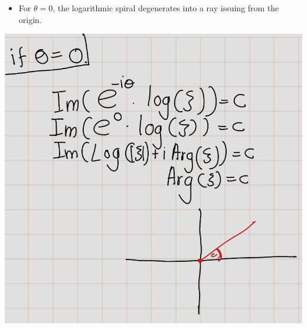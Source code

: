 \documentclass[
]{book}
\providecommand{\tightlist}{%
  \setlength{\itemsep}{0pt}\setlength{\parskip}{0pt}}
\theoremstyle{definition}
\theoremstyle{definition}
\theoremstyle{definition}
\theoremstyle{definition}
\theoremstyle{remark}
\begin{document}
\begin{itemize}
\tightlist
\item
  For \(\theta = 0\), the logarithmic spiral degenerates into a ray issuing from the origin.
\end{itemize}

\includegraphics[width=10.6in]{figures/Helical_Domain/fig2}
\end{document}
